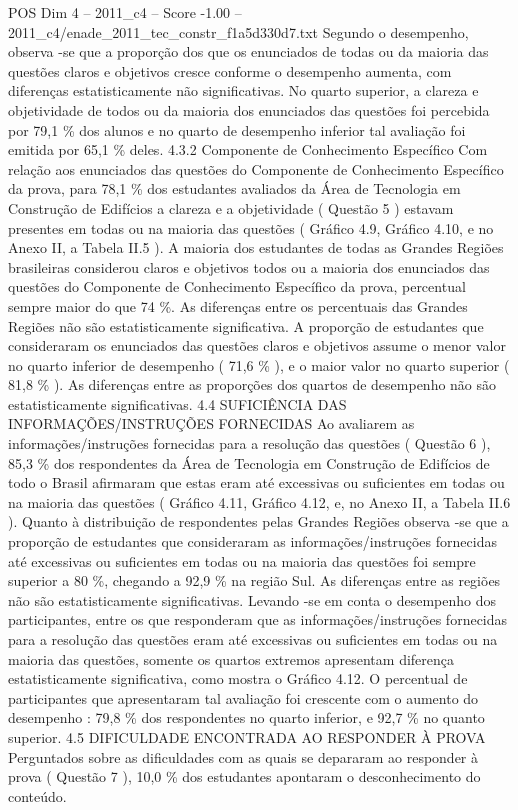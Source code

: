 \begin{textsample}{POS Dim 4 – 2011\_c4 – Score -1.00 – 2011\_c4/enade\_2011\_tec\_constr\_f1a5d330d7.txt}
Segundo o desempenho, observa -se que a proporção dos que os enunciados de todas ou da maioria das questões claros e objetivos cresce conforme o desempenho aumenta, com diferenças estatisticamente não significativas.
No quarto superior, a clareza e objetividade de todos ou da maioria dos enunciados das questões foi percebida por 79,1 \% dos alunos e no quarto de desempenho inferior tal avaliação foi emitida por 65,1 \% deles. 4.3.2 Componente de Conhecimento Específico Com relação aos enunciados das questões do Componente de Conhecimento Específico da prova, para 78,1 \% dos estudantes avaliados da Área de Tecnologia em Construção de Edifícios a clareza e a objetividade ( Questão 5 ) estavam presentes em todas ou na maioria das questões ( Gráfico 4.9, Gráfico 4.10, e no Anexo II, a Tabela II.5 ).
A maioria dos estudantes de todas as Grandes Regiões brasileiras considerou claros e objetivos todos ou a maioria dos enunciados das questões do Componente de Conhecimento Específico da prova, percentual sempre maior do que 74 \%.
As diferenças entre os percentuais das Grandes Regiões não são estatisticamente significativa.
A proporção de estudantes que consideraram os enunciados das questões claros e objetivos assume o menor valor no quarto inferior de desempenho ( 71,6 \% ), e o maior valor no quarto superior ( 81,8 \% ).
As diferenças entre as proporções dos quartos de desempenho não são estatisticamente significativas. 4.4 SUFICIÊNCIA DAS INFORMAÇÕES/INSTRUÇÕES FORNECIDAS Ao avaliarem as informações/instruções fornecidas para a resolução das questões ( Questão 6 ), 85,3 \% dos respondentes da Área de Tecnologia em Construção de Edifícios de todo o Brasil afirmaram que estas eram até excessivas ou suficientes em todas ou na maioria das questões ( Gráfico 4.11, Gráfico 4.12, e, no Anexo II, a Tabela II.6 ).
Quanto à distribuição de respondentes pelas Grandes Regiões observa -se que a proporção de estudantes que consideraram as informações/instruções fornecidas até excessivas ou suficientes em todas ou na maioria das questões foi sempre superior a 80 \%, chegando a 92,9 \% na região Sul.
As diferenças entre as regiões não são estatisticamente significativas.
Levando -se em conta o desempenho dos participantes, entre os que responderam que as informações/instruções fornecidas para a resolução das questões eram até excessivas ou suficientes em todas ou na maioria das questões, somente os quartos extremos apresentam diferença estatisticamente significativa, como mostra o Gráfico 4.12.
O percentual de participantes que apresentaram tal avaliação foi crescente com o aumento do desempenho : 79,8 \% dos respondentes no quarto inferior, e 92,7 \% no quanto superior. 4.5 DIFICULDADE ENCONTRADA AO RESPONDER À PROVA Perguntados sobre as dificuldades com as quais se depararam ao responder à prova ( Questão 7 ), 10,0 \% dos estudantes apontaram o desconhecimento do conteúdo.

\end{textsample}
